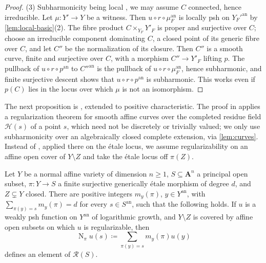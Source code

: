 \documentclass[11pt,a4paper]{article}
\newcommand{\an}{\mathrm{an}}          %
\newcommand{\Norm}{\operatorname{N}}
\begin{document}
\begin{proof}
(3) Subharmonicity being local \cite[Proposition~3.5(1)]{GublerRabinoff25}, we may assume $C$ connected, hence irreducible. Let $\mu\colon Y'\to Y$ be a witness. Then $u\circ r\circ\mu_F^{\an}$ is locally psh on $Y_F'^{\an}$ by \cref{lem:local-basic}(2). The fibre product $C\times_{Y_F}Y'_F$ is proper and surjective over $C$; choose an irreducible component dominating $C$, a closed point of its generic fibre over $C$, and let $C''$ be the normalization of its closure. Then $C''$ is a smooth curve, finite and surjective over $C$, with a morphism $C''\to Y'_F$ lifting $p$. The pullback of $u\circ r\circ p^{\an}$ to $C''^{\an}$ is the pullback of $u\circ r\circ\mu_F^{\an}$, hence subharmonic, and finite surjective descent \cite[Proposition~3.5(8)]{GublerRabinoff25} shows that $u\circ r\circ p^{\an}$ is subharmonic. This works even if $p(C)$ lies in the locus over which $\mu$ is not an isomorphism.
\end{proof}

The next proposition is \cite[Proposition~6.12]{Wu26}, extended to positive characteristic. The proof in \cite{Wu26} applies a regularization theorem for smooth affine curves over the completed residue field $\mathcal H(s)$ of a point $s$, which need not be discretely or trivially valued; we only use subharmonicity over an algebraically closed complete extension, via \cref{lem:curves}. Instead of \cite[Proposition~6.2(2)]{Wu26}, applied there on the \'etale locus, we assume regularizability on an affine open cover of $Y\setminus Z$ and take the \'etale locus off $\pi(Z)$.

\begin{proposition}\label{prop:nonflat-norm}
Let $Y$ be a normal affine variety of dimension $n\ge1$, $S\subseteq\mathbf A^n$ a principal open subset, $\pi\colon Y\to S$ a finite surjective generically \'etale morphism of degree $d$, and $Z\subsetneq Y$ closed. There are positive integers $m_y(\pi)$, $y\in Y^{\an}$, with $\sum_{\pi(y)=s}m_y(\pi)=d$ for every $s\in S^{\an}$, such that the following holds. If $u$ is a weakly psh function on $Y^{\an}$ of logarithmic growth, and $Y\setminus Z$ is covered by affine open subsets on which $u$ is regularizable, then
\[
\Norm_\pi u(s)\coloneqq\sum_{\pi(y)=s}m_y(\pi)u(y)
\]
defines an element of $\mathcal{R}(S)$.
\end{proposition}
\end{document}
